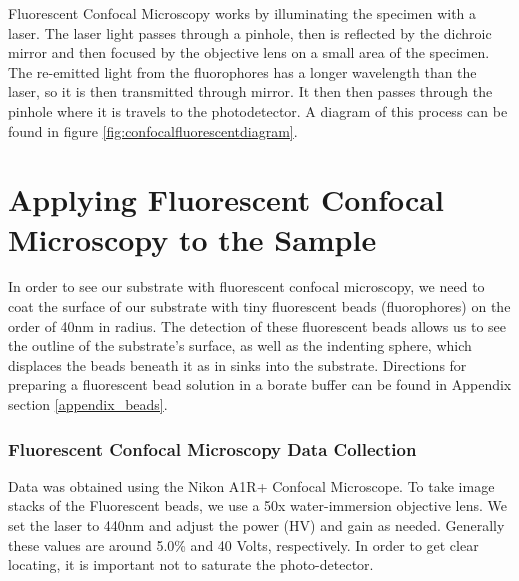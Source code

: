 Fluorescent Confocal Microscopy works by illuminating the specimen with a laser. The laser light passes through a pinhole, then is reflected by the dichroic mirror and then focused by the objective lens on a small area of the specimen. The re-emitted light from the fluorophores has a longer wavelength than the laser, so it is then transmitted through mirror.  It then then passes through the pinhole where it is travels to the photodetector. A diagram of this process can be found in figure \ref{fig:confocalfluorescentdiagram}.

\section{Applying Fluorescent Confocal Microscopy to the Sample}
In order to see our substrate with fluorescent confocal microscopy, we need to coat the surface of our substrate with tiny fluorescent beads (fluorophores) on the order of 40nm in radius. The detection of these fluorescent beads allows us to see the outline of the substrate's surface, as well as the indenting sphere, which displaces the beads beneath it as in sinks into the substrate. Directions for preparing a fluorescent bead solution in a borate buffer can be found in Appendix section \ref{appendix_beads}. 

\subsubsection{Fluorescent Confocal Microscopy Data Collection}
Data was obtained using the Nikon A1R+ Confocal Microscope. To take image stacks of the Fluorescent beads, we use a 50x water-immersion objective lens. We set the laser to 440nm and adjust the power (HV) and gain as needed. Generally these values are around 5.0\% and 40 Volts, respectively. In order to get clear locating, it is important not to saturate the photo-detector. 

